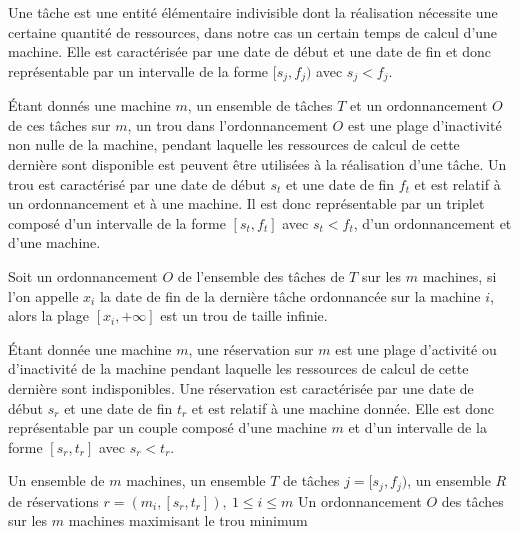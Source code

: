 \documentclass[a4paper,11pt]{thesis}
\begin{document}



\begin{ndf}[Tâche]
    Une tâche est une entité élémentaire indivisible dont la réalisation nécessite une certaine
    quantité de ressources, dans notre cas un certain temps de calcul d'une machine. Elle est
    caractérisée par une date de début et une date de fin et donc représentable par un intervalle de
    la forme $[s_j, f_j)$ avec $s_j < f_j$.
\end{ndf}

\begin{ndf}[Trou]
    Étant donnés une machine $m$, un ensemble de tâches $T$ et un ordonnancement $O$ de ces tâches
    sur $m$, un trou dans l'ordonnancement $O$ est une plage d'inactivité non nulle de la machine,
    pendant laquelle les ressources de calcul de cette dernière sont disponible est peuvent être
    utilisées à la réalisation d'une tâche. Un trou est caractérisé par une date de début $s_t$ et
    une date de fin $f_t$ et est relatif à un ordonnancement et à une machine. Il est donc
    représentable par un triplet composé d'un intervalle de la forme $[s_t, f_t]$ avec $s_t <
    f_t$, d'un ordonnancement et d'une machine.
\end{ndf}

\begin{nrmq}
    Soit un ordonnancement $O$ de l'ensemble des tâches de $T$ sur les $m$ machines, si l'on appelle
    $x_i$ la date de fin de la dernière tâche ordonnancée sur la machine $i$, alors la plage
    $[x_i,+\infty]$ est un trou de taille infinie.
\end{nrmq}

\begin{ndf}[Réservation]
    Étant donnée une machine $m$, une réservation sur $m$ est une plage d'activité ou
    d'inactivité de la machine pendant laquelle les ressources de calcul de cette dernière sont
    indisponibles. Une réservation est caractérisée par une date de début $s_r$ et une date de fin
    $t_r$ et est relatif à une machine donnée. Elle est donc représentable par un couple composé
    d'une machine $m$ et d'un intervalle de la forme $[s_r, t_r]$ avec $s_r < t_r$.
\end{ndf}

\dfopt{\fisched}
    {Un ensemble de $m$ machines, un ensemble $T$ de tâches $j = [s_j, f_j)$, un ensemble $R$ de
        réservations $r = (m_i, [s_r, t_r]),\ 1 \leq i \leq m$}
    {Un ordonnancement $O$ des tâches sur les $m$ machines maximisant le trou minimum}
\end{document}
